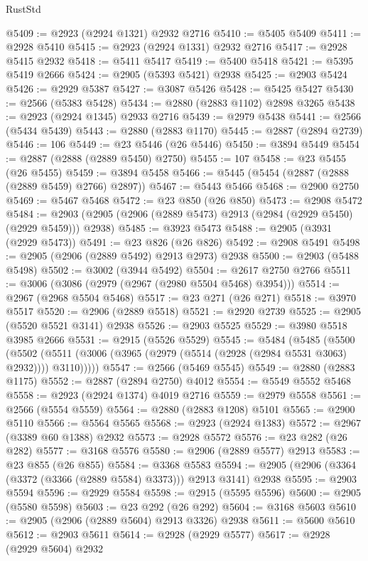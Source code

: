 \begin{lexlean}{RustStd}
\begin{coremodule}
{\begin{coremodule}
{{{{{{{{{{{{{{{{{{{{{{{{{{{{{{{{{{{{{{{{{{{{{{{{{{{{{{{{{{{{{{{{{{{{{{{{{{{{{{@5409 := @2923 (@2924 @1321) @2932 @2716
@5410 := @5405 @5409
@5411 := @2928 @5410
@5415 := @2923 (@2924 @1331) @2932 @2716
@5417 := @2928 @5415 @2932
@5418 := @5411 @5417
@5419 := @5400 @5418
@5421 := @5395 @5419 @2666
@5424 := @2905 (@5393 @5421) @2938
@5425 := @2903 @5424
@5426 := @2929 @5387
@5427 := @3087 @5426
@5428 := @5425 @5427
@5430 := @2566 (@5383 @5428)
@5434 := @2880 (@2883 @1102) @2898 @3265
@5438 := @2923 (@2924 @1345) @2933 @2716
@5439 := @2979 @5438
@5441 := @2566 (@5434 @5439)
@5443 := @2880 (@2883 @1170)
@5445 := @2887 (@2894 @2739)
@5446 := 106
@5449 := @23 @5446 (@26 @5446)
@5450 := @3894 @5449
@5454 := @2887 (@2888 (@2889 @5450) @2750)
@5455 := 107
@5458 := @23 @5455 (@26 @5455)
@5459 := @3894 @5458
@5466 := @5445 (@5454 (@2887 (@2888 (@2889 @5459) @2766) @2897))
@5467 := @5443 @5466
@5468 := @2900 @2750
@5469 := @5467 @5468
@5472 := @23 @850 (@26 @850)
@5473 := @2908 @5472
@5484 := @2903 (@2905 (@2906 (@2889 @5473) @2913 (@2984 (@2929 @5450) (@2929 @5459))) @2938)
@5485 := @3923 @5473
@5488 := @2905 (@3931 (@2929 @5473))
@5491 := @23 @826 (@26 @826)
@5492 := @2908 @5491
@5498 := @2905 (@2906 (@2889 @5492) @2913 @2973) @2938
@5500 := @2903 (@5488 @5498)
@5502 := @3002 (@3944 @5492)
@5504 := @2617 @2750 @2766
@5511 := @3006 (@3086 (@2979 (@2967 (@2980 @5504 @5468) @3954)))
@5514 := @2967 (@2968 @5504 @5468)
@5517 := @23 @271 (@26 @271)
@5518 := @3970 @5517
@5520 := @2906 (@2889 @5518)
@5521 := @2920 @2739
@5525 := @2905 (@5520 @5521 @3141) @2938
@5526 := @2903 @5525
@5529 := @3980 @5518 @3985 @2666
@5531 := @2915 (@5526 @5529)
@5545 := @5484
    (@5485
      (@5500
        (@5502 (@5511 (@3006 (@3965 (@2979 (@5514 (@2928 (@2984 @5531 @3063) @2932)))) @3110)))))
@5547 := @2566 (@5469 @5545)
@5549 := @2880 (@2883 @1175)
@5552 := @2887 (@2894 @2750) @4012
@5554 := @5549 @5552 @5468
@5558 := @2923 (@2924 @1374) @4019 @2716
@5559 := @2979 @5558
@5561 := @2566 (@5554 @5559)
@5564 := @2880 (@2883 @1208) @5101
@5565 := @2900 @5110
@5566 := @5564 @5565
@5568 := @2923 (@2924 @1383)
@5572 := @2967 (@3389 @60 @1388) @2932
@5573 := @2928 @5572
@5576 := @23 @282 (@26 @282)
@5577 := @3168 @5576
@5580 := @2906 (@2889 @5577) @2913
@5583 := @23 @855 (@26 @855)
@5584 := @3368 @5583
@5594 := @2905 (@2906 (@3364 (@3372 (@3366 (@2889 @5584) @3373))) @2913 @3141) @2938
@5595 := @2903 @5594
@5596 := @2929 @5584
@5598 := @2915 (@5595 @5596)
@5600 := @2905 (@5580 @5598)
@5603 := @23 @292 (@26 @292)
@5604 := @3168 @5603
@5610 := @2905 (@2906 (@2889 @5604) @2913 @3326) @2938
@5611 := @5600 @5610
@5612 := @2903 @5611
@5614 := @2928 (@2929 @5577)
@5617 := @2928 (@2929 @5604) @2932
}}}}}}}}}}}}}}}}}}}}}}}}}}}}}}}}}}}}}}}}}}}}}}}}}}}}}}}}}}}}}}}}}}}}}}}}}}}}}}
\end{coremodule}}
\end{coremodule}
\end{lexlean}
